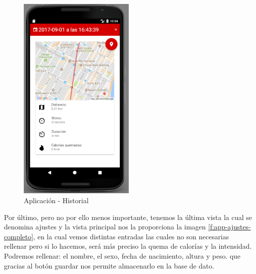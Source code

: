 \documentclass[a4paper, 11pt]{article}
\begin{document}
\begin{itemize}
                  \begin{figure}[H]
                   \centering
                   \includegraphics[width=0.5\textwidth]{9historial-carrera}
                   \caption{Aplicación - Historial}
                   \label{f:app-historial-carrera}
                  \end{figure}

      Por último, pero no por ello menos importante, tenemos la última vista la cual se denomina ajustes y la vista
      principal nos la proporciona la imagen \ref{f:app-ajustes-completo}, en la cual vemos distintas entradas
      las cuales no son necesarias rellenar pero si lo hacemos, será más preciso la quema de calorías y
      la intensidad. Podremos rellenar: el nombre, el sexo, fecha de nacimiento, altura y peso. que gracias al
      botón guardar nos permite almacenarlo en la base de dato. \\


\end{itemize}
\end{document}
